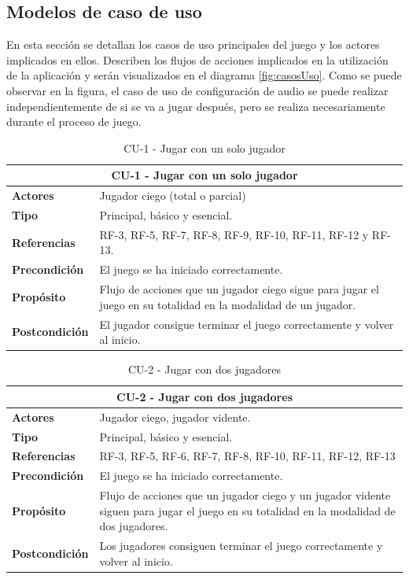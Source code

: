 \subsection{Modelos de caso de uso}
En esta sección se detallan los casos de uso principales del juego y los actores implicados en ellos. Describen los flujos de acciones implicados en la utilización de la aplicación y serán visualizados en el diagrama \ref{fig:casosUso}. Como se puede observar en la figura, el caso de uso de configuración de audio se puede realizar independientemente de si se va a jugar después, pero se realiza necesariamente durante el proceso de juego.
\begin{table}[H]
	\centering
	\caption{CU-1 - Jugar con un solo jugador}
	\label{table:CU1}
	\begin{tabular}{|l|p{10cm}|}
		\hline
		\multicolumn{2}{|c|}{\textbf{CU-1 - Jugar con un solo jugador}} \\
		\hline
		\textbf{Actores} & Jugador ciego (total o parcial)  \\
		\hline
		\textbf{Tipo} & Principal, básico y esencial. \\
		\hline
		\textbf{Referencias} & RF-3, RF-5, RF-7, RF-8, RF-9, RF-10, RF-11, RF-12 y RF-13. \\
		\hline
		\textbf{Precondición} & El juego se ha iniciado correctamente. \\
		\hline
		\textbf{Propósito} & Flujo de acciones que un jugador ciego sigue para jugar el juego en su totalidad en la modalidad de un jugador. \\
		\hline
		\textbf{Postcondición} & El jugador consigue terminar el juego correctamente y volver al inicio. \\
		\hline
	\end{tabular}
	
\end{table}
\begin{table}[H]
	\centering
	\caption{CU-2 - Jugar con dos jugadores}
	\label{table:CU2}
	\begin{tabular}{|l|p{10cm}|}
		\hline
		\multicolumn{2}{|c|}{\textbf{CU-2 - Jugar con dos jugadores}} \\
		\hline
		\textbf{Actores} & Jugador ciego, jugador vidente.  \\
		\hline
		\textbf{Tipo} &  Principal, básico y esencial. \\
		\hline
		\textbf{Referencias} & RF-3, RF-5, RF-6, RF-7, RF-8, RF-10, RF-11, RF-12, RF-13 \\
		\hline
		\textbf{Precondición} & El juego se ha iniciado correctamente. \\
		\hline
		\textbf{Propósito} & Flujo de acciones que un jugador ciego y un jugador vidente siguen para jugar el juego en su totalidad en la modalidad de dos jugadores. \\
		\hline
		\textbf{Postcondición} & Los jugadores consiguen terminar el juego correctamente y volver al inicio. \\
		\hline
	\end{tabular}
	
\end{table}
